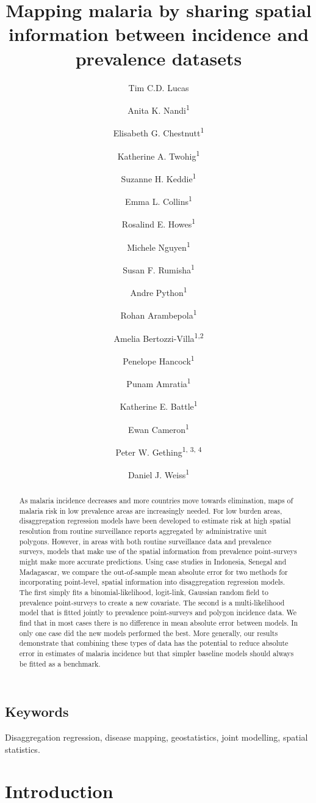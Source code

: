 \documentclass{statsoc}
\title[Mapping malaria by sharing spatial information]{Mapping malaria by sharing spatial information between incidence and prevalence datasets}
\author[Tim C.D. Lucas {\it et al.}]{Tim C.D. Lucas}
\author{Anita K. Nandi\textsuperscript{1}}
\author{Elisabeth G. Chestnutt\textsuperscript{1}}
\author{Katherine A. Twohig\textsuperscript{1}}
\author{Suzanne H. Keddie\textsuperscript{1}}
\author{Emma L. Collins\textsuperscript{1}}
\author{Rosalind E. Howes\textsuperscript{1}}
\author{Michele Nguyen\textsuperscript{1}}
\author{Susan F. Rumisha\textsuperscript{1}}
\author{Andre Python\textsuperscript{1}}
\author{Rohan Arambepola\textsuperscript{1}}
\author{Amelia Bertozzi-Villa\textsuperscript{1,2}}
\author{Penelope Hancock\textsuperscript{1}}
\author{Punam Amratia\textsuperscript{1}}
\author{Katherine E. Battle\textsuperscript{1}}
\author{Ewan Cameron\textsuperscript{1}}
\author{Peter W. Gething\textsuperscript{1, 3, 4}}
\author{Daniel J. Weiss\textsuperscript{1}}
\begin{document}
\begin{abstract}
As malaria incidence decreases and more countries move towards elimination, maps of malaria risk in low prevalence areas are increasingly needed.
For low burden areas, disaggregation regression models have been developed to estimate risk at high spatial resolution from routine surveillance reports aggregated by administrative unit polygons.
However, in areas with both routine surveillance data and prevalence surveys, models that make use of the spatial information from prevalence point-surveys might make more accurate predictions.
Using case studies in Indonesia, Senegal and Madagascar, we compare the out-of-sample mean absolute error for two methods for incorporating point-level, spatial information into disaggregation regression models.
The first simply fits a binomial-likelihood, logit-link, Gaussian random field to prevalence point-surveys to create a new covariate.
The second is a multi-likelihood model that is fitted jointly to prevalence point-surveys and polygon incidence data.
We find that in most cases there is no difference in mean absolute error between models.
In only one case did the new models performed the best.
More generally, our results demonstrate that combining these types of data has the potential to reduce absolute error in estimates of malaria incidence but that simpler baseline models should always be fitted as a benchmark.
\end{abstract}

\subsection{Keywords}
Disaggregation regression, disease mapping, geostatistics, joint modelling, spatial statistics.


\section*{Introduction}


\end{document}
